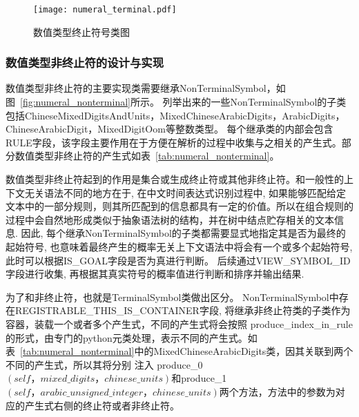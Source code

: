 \begin{figure}[h]
    \centering
    \texttt{[image: numeral\_terminal.pdf]}
    \caption{数值类型终止符号类图}
    \label{fig:numeral_terminal}
\end{figure}

\subsubsection{数值类型非终止符的设计与实现}

数值类型非终止符的主要实现类需要继承NonTerminalSymbol，如图~\ref{fig:numeral_nonterminal}所示。
列举出来的一些NonTerminalSymbol的子类包括ChineseMixedDigitsAndUnits，MixedChineseArabicDigits，ArabicDigits，ChineseArabicDigit，MixedDigitOom等整数类型。
每个继承类的内部会包含RULE字段，该字段主要作用在于方便在解析的过程中收集与之相关的产生式。部分数值类型非终止符的产生式如表~\ref{tab:numeral_nonterminal}。

数值类型非终止符起到的作用是集合或生成终止符或其他非终止符。和一般性的上下文无关语法不同的地方在于, 在中文时间表达式识别过程中, 如果能够匹配给定文本中的一部分规则，则其所匹配到的信息都具有一定的价值。所以在组合规则的过程中会自然地形成类似于抽象语法树的结构，并在树中结点贮存相关的文本信息.
因此, 每个继承NonTerminalSymbol的子类都需要显式地指定其是否为最终的起始符号, 也意味着最终产生的概率无关上下文语法中将会有一个或多个起始符号, 此时可以根据IS\_GOAL字段是否为真进行判断。
后续通过VIEW\_SYMBOL\_ID字段进行收集, 再根据其真实符号的概率值进行判断和排序并输出结果.

为了和非终止符，也就是TerminalSymbol类做出区分。
NonTerminalSymbol中存在REGISTRABLE\_THIS\_IS\_CONTAINER字段,
将继承非终止符类的子类作为容器，装载一个或者多个产生式，不同的产生式将会按照
produce\_index\_in\_rule的形式，由专门的python元类处理，表示不同的产生式。如表~\ref{tab:numeral_nonterminal}中的MixedChineseArabicDigits类，因其关联到两个不同的产生式，所以其将分别
注入 produce\_0$\left(self，mixed\_digits，chinese\_units\right)$和produce\_1$\left(self，arabic\_unsigned\_integer，chinese\_units\right)$两个方法，方法中的参数为对应的产生式右侧的终止符或者非终止符。

